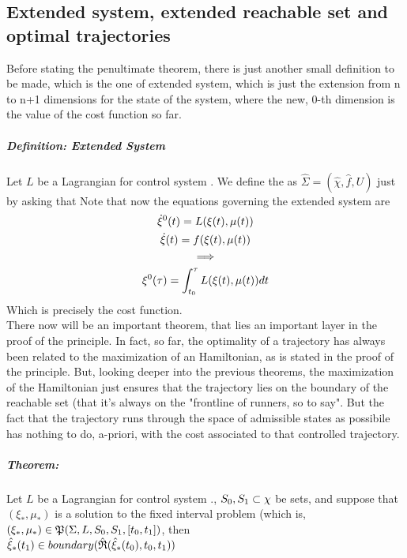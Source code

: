 \subsection{Extended system, extended reachable set and optimal trajectories}
Before stating the penultimate theorem, there is just another small definition to be made, which is the one of extended system, which is just the extension from n to n+1 dimensions for the state of the system, where the new, 0-th dimension is the value of the cost function so far.

\subparagraph[6.1]{Definition: Extended System} Let $L$ be a Lagrangian for control system \controlSystem. We define the  as $\hat{\Sigma}=(\hat\chi,\hat{f},U)$ just by asking that 
Note that now the equations governing the extended system are 
\begin{gather*}
	 \dot{\xi}^0(t)=L(\xi (t),\mu(t))\\
	\dot{\xi}(t)=f(\xi (t),\mu(t))\\
	\implies\\
	\xi^0(\tau)=\int_{t_0}^{\tau}L(\xi (t),\mu(t))dt
\end{gather*}
Which is precisely the cost function.\\
There now will be an important theorem, that lies an important layer in the proof of the principle. In fact, so far, the optimality of a trajectory has always been related to the maximization of an Hamiltonian, as is stated in the proof of the principle. But, looking deeper into the previous theorems, the maximization of the Hamiltonian just ensures that the trajectory lies on the boundary of the reachable set (that it's always on the "frontline of runners, so to say". But the fact that the trajectory runs through the space of admissible states as possibile has nothing to do, a-priori, with the cost associated to that controlled trajectory. 
\subparagraph[6.2]{Theorem:}Let $L$ be a Lagrangian for control system \controlSystem., $S_0,S_1\subset\chi$ be sets, and suppose that $(\xi_*,\mu_*)$ is a solution to the fixed interval problem (which is, $(\xi_*,\mu_*)\in\mathfrak{P}(\Sigma,L,S_0,S_1,[t_0,t_1])$, then\\
$\hat{\xi}_*(t_1)\in boundary(\hat{\mathfrak{R}}(\hat\xi_*(t_0),t_0,t_1))$\\
